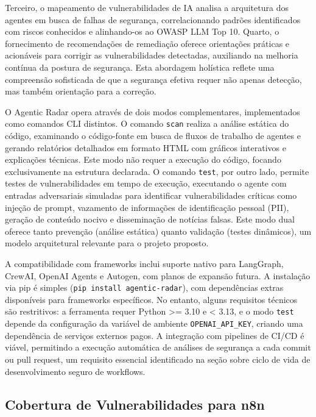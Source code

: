 \documentclass{sftex}
\begin{document}
Terceiro, o mapeamento de vulnerabilidades de IA analisa a arquitetura dos agentes em busca de falhas de segurança, correlacionando padrões identificados com riscos conhecidos e alinhando-os ao OWASP LLM Top 10. Quarto, o fornecimento de recomendações de remediação oferece orientações práticas e acionáveis para corrigir as vulnerabilidades detectadas, auxiliando na melhoria contínua da postura de segurança. Esta abordagem holística reflete uma compreensão sofisticada de que a segurança efetiva requer não apenas detecção, mas também orientação para a correção.

O Agentic Radar opera através de dois modos complementares, implementados como comandos CLI distintos. O comando \texttt{scan} realiza a análise estática do código, examinando o código-fonte em busca de fluxos de trabalho de agentes e gerando relatórios detalhados em formato HTML com gráficos interativos e explicações técnicas. Este modo não requer a execução do código, focando exclusivamente na estrutura declarada. O comando \texttt{test}, por outro lado, permite testes de vulnerabilidades em tempo de execução, executando o agente com entradas adversariais simuladas para identificar vulnerabilidades críticas como injeção de prompt, vazamento de informações de identificação pessoal (PII), geração de conteúdo nocivo e disseminação de notícias falsas. Este modo dual oferece tanto prevenção (análise estática) quanto validação (testes dinâmicos), um modelo arquitetural relevante para o projeto proposto.

A compatibilidade com frameworks inclui suporte nativo para LangGraph, CrewAI, OpenAI Agents e Autogen, com planos de expansão futura. A instalação via pip é simples (\texttt{pip install agentic-radar}), com dependências extras disponíveis para frameworks específicos. No entanto, alguns requisitos técnicos são restritivos: a ferramenta requer Python >= 3.10 e < 3.13, e o modo \texttt{test} depende da configuração da variável de ambiente \texttt{OPENAI\_API\_KEY}, criando uma dependência de serviços externos pagos. A integração com pipelines de CI/CD é viável, permitindo a execução automática de análises de segurança a cada commit ou pull request, um requisito essencial identificado na seção sobre ciclo de vida de desenvolvimento seguro de workflows.

\subsection{Cobertura de Vulnerabilidades para n8n}
\end{document}
